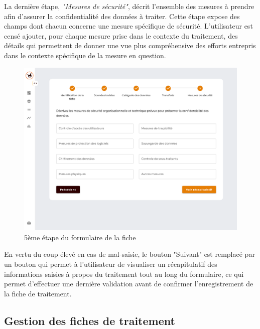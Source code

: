\clearpage

\noindent 
La dernière étape, \textit{"Mesures de sécurité"}, décrit l'ensemble des mesures à prendre afin d'assurer la confidentialité des données à traiter. Cette étape expose des champs dont chacun concerne une mesure spécifique de sécurité. L'utilisateur est censé ajouter, pour chaque mesure prise dans le contexte du traitement, des détails qui permettent de donner une vue plus compréhensive des efforts entrepris dans le contexte spécifique de la mesure en question. \\


\begin{figure}[H]
    \centering
    \includegraphics[width=\textwidth]{images/guis/nouvelle-fiche/nouvelle-fiche-5.png} 
    \caption{5ème étape du formulaire de la fiche}
\end{figure}

\noindent En vertu du coup élevé en cas de mal-saisie, le bouton "Suivant" est remplacé par un bouton qui permet à l'utilisateur de visualiser un récapitulatif des informations saisies à propos du traitement tout au long du formulaire, ce qui permet d'effectuer une dernière validation avant de confirmer l'enregistrement de la fiche de traitement. \\

\clearpage


\subsection{Gestion des fiches de traitement}

